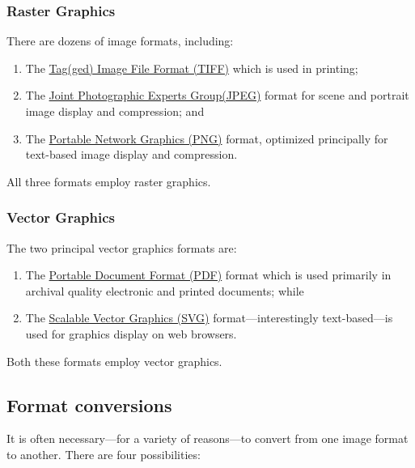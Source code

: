 \documentclass[
  11pt,
  british,
  a4paper,
]{article}
\providecommand{\tightlist}{%
  \setlength{\itemsep}{0pt}\setlength{\parskip}{0pt}}
\begin{document}
\hypertarget{raster-graphics}{%
\subsubsection{Raster Graphics}\label{raster-graphics}}

There are dozens of image formats, including:

\begin{enumerate}
\tightlist
\item
  The \href{https://en.wikipedia.org/wiki/TIFF}{Tag(ged) Image File
  Format (TIFF)} which is used in printing;
\item
  The \href{https://jpeg.org/about.html}{Joint Photographic Experts
  Group(JPEG)} format for scene and portrait image display and
  compression; and
\item
  The \href{http://www.libpng.org/pub/png/}{Portable Network Graphics
  (PNG)} format, optimized principally for text-based image display and
  compression.
\end{enumerate}

All three formats employ raster graphics.

\hypertarget{vector-graphics}{%
\subsubsection{Vector Graphics}\label{vector-graphics}}

The two principal vector graphics formats are:

\begin{enumerate}
\tightlist
\item
  The \href{https://en.wikipedia.org/wiki/PDF}{Portable Document Format
  (PDF)} format which is used primarily in archival quality electronic
  and printed documents; while
\item
  The
  \href{https://en.wikipedia.org/wiki/Scalable_Vector_Graphics}{Scalable
  Vector Graphics (SVG)} format---interestingly text-based---is used for
  graphics display on web browsers.
\end{enumerate}

Both these formats employ vector graphics.

\hypertarget{format-conversions}{%
\subsection{Format conversions}\label{format-conversions}}

It is often necessary---for a variety of reasons---to convert from one
image format to another. There are four possibilities:
\end{document}
